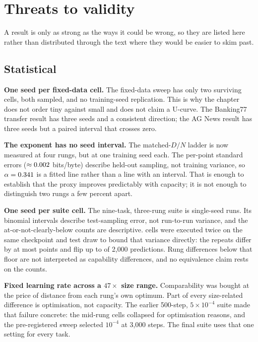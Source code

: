 \chapter{Threats to validity}
\label{ch:threats}

A result is only as strong as the ways it could be wrong, so they are listed here
rather than distributed through the text where they would be easier to skim past.

\section{Statistical}

\textbf{One seed per fixed-data cell.} The fixed-data sweep has only two surviving
cells, both sampled, and no training-seed replication. This is why the chapter
does not order tiny against small and does not claim a U-curve. The Banking77
transfer result has three seeds and a consistent direction; the AG News result has
three seeds but a paired interval that crosses zero.

\textbf{The exponent has no seed interval.} The matched-$D/N$ ladder is now
measured at four rungs, but at one training seed each. The per-point standard
errors ($\approx 0.002$ bits/byte) describe held-out sampling, not
training variance, so $\alpha = 0.341$ is a fitted line rather than a line
with an interval. That is enough to establish that the proxy improves
predictably with capacity; it is not enough to distinguish two rungs a few
percent apart.

\textbf{One seed per suite cell.} The nine-task, three-rung suite is
\SuiteTotalCells{} single-seed runs. Its binomial intervals describe
test-sampling error, not run-to-run variance, and the at-or-not-clearly-below
counts are descriptive. \SuiteReplicationCells{} cells were executed twice on the same
checkpoint and test draw to bound that variance directly: the repeats differ by at most
\SuiteReplicationMax{} points and flip up to \SuiteReplicationFlips{} of
2{,}000 predictions. Rung differences below that floor are not interpreted as
capability differences, and no equivalence claim rests on the counts.


\textbf{Fixed learning rate across a $47\times$ size range.} Comparability was
bought at the price of distance from each rung's own optimum. Part of every
size-related difference is optimisation, not capacity. The earlier 500-step,
\(5\times10^{-4}\) suite made that failure concrete: the mid-rung cells collapsed
for optimisation reasons, and the pre-registered sweep selected \(10^{-4}\) at
3{,}000 steps. The final suite uses that one setting for every task.



